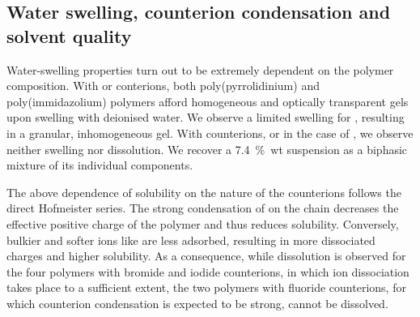 \documentclass[twoside,twocolumn,9pt]{article}
\begin{document}
\subsection{Water swelling, counterion condensation and solvent quality}
Water-swelling properties turn out to be extremely dependent on the polymer composition. With  or  conterions, both poly(pyrrolidinium) and poly(immidazolium) polymers afford homogeneous and optically transparent gels upon swelling with deionised water. We observe a limited swelling for , resulting in a granular, inhomogeneous gel. With  counterions, or in the case of , we observe neither swelling nor dissolution. We recover a 7.4~\%~wt suspension as a biphasic mixture of its individual components.

The above dependence of solubility on the nature of the counterions follows the direct Hofmeister series. The strong condensation of  on the chain decreases the effective positive charge of the polymer and thus reduces solubility. Conversely, bulkier and softer ions like  are less adsorbed, resulting in more dissociated charges and higher solubility. As a consequence, while dissolution is observed for the four polymers with bromide and iodide counterions, in which ion dissociation takes place to a sufficient extent, the two polymers with fluoride counterions, for which counterion condensation is expected to be strong, cannot be dissolved.
\end{document}
